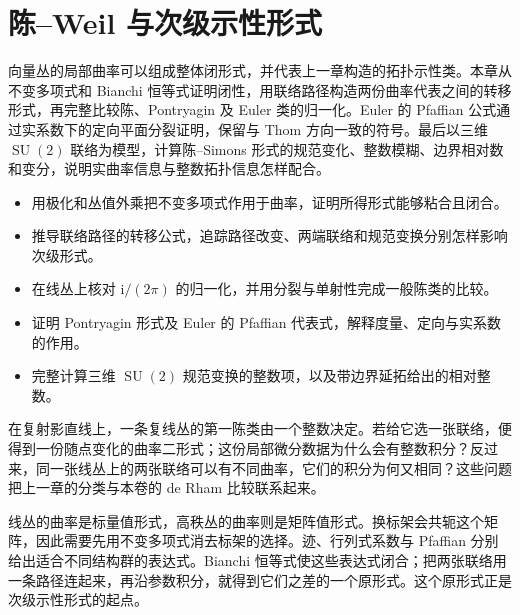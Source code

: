 
% 
% 

\chapter{陈–Weil 与次级示性形式}
\label{g2:ch:22}

\begin{chapterabstract}
	向量丛的局部曲率可以组成整体闭形式，并代表上一章构造的拓扑示性类。本章从不变多项式和 Bianchi 恒等式证明闭性，用联络路径构造两份曲率代表之间的转移形式，再完整比较陈、Pontryagin 及 Euler 类的归一化。Euler 的 Pfaffian 公式通过实系数下的定向平面分裂证明，保留与 Thom 方向一致的符号。最后以三维 \(\operatorname{SU}(2)\) 联络为模型，计算陈--Simons 形式的规范变化、整数模糊、边界相对数和变分，说明实曲率信息与整数拓扑信息怎样配合。
\end{chapterabstract}

\begin{learninggoals}
	\begin{itemize}
		\item 用极化和丛值外乘把不变多项式作用于曲率，证明所得形式能够粘合且闭合。
		\item 推导联络路径的转移公式，追踪路径改变、两端联络和规范变换分别怎样影响次级形式。
		\item 在线丛上核对 \(\mathrm i/(2\pi)\) 的归一化，并用分裂与单射性完成一般陈类的比较。
		\item 证明 Pontryagin 形式及 Euler 的 Pfaffian 代表式，解释度量、定向与实系数的作用。
		\item 完整计算三维 \(\operatorname{SU}(2)\) 规范变换的整数项，以及带边界延拓给出的相对整数。
	\end{itemize}
\end{learninggoals}

在复射影直线上，一条复线丛的第一陈类由一个整数决定。若给它选一张联络，便得到一份随点变化的曲率二形式；这份局部微分数据为什么会有整数积分？反过来，同一张线丛上的两张联络可以有不同曲率，它们的积分为何又相同？这些问题把上一章的分类与本卷的 de Rham 比较联系起来。

\ProseParagraphBreak

线丛的曲率是标量值形式，高秩丛的曲率则是矩阵值形式。换标架会共轭这个矩阵，因此需要先用不变多项式消去标架的选择。迹、行列式系数与 Pfaffian 分别给出适合不同结构群的表达式。Bianchi 恒等式使这些表达式闭合；把两张联络用一条路径连起来，再沿参数积分，就得到它们之差的一个原形式。这个原形式正是次级示性形式的起点。

